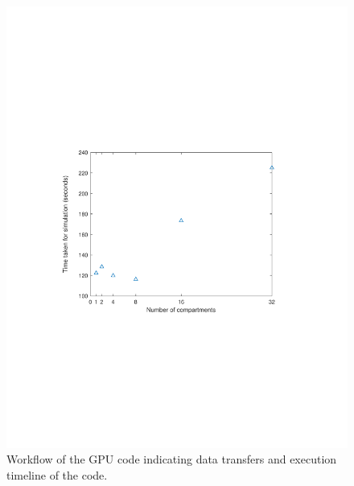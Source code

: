 \documentclass[preprint,10pt,authoryear,review]{elsarticle}
\begin{document}
\begin{linenumbers}
\begin{figure}[h]
\centering
\includegraphics[scale=0.7,trim=110 220 120 220, clip]{desktopgputiming.pdf}
\caption{Workflow of the GPU code indicating data transfers and execution timeline of the code.}
\label{fig:res_gpu_timings}
\end{figure}


\end{linenumbers}
\end{document}
